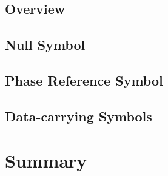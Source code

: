 \documentclass[class=report,11pt,crop=false]{standalone}
\begin{document}
\subsection{Overview}

\subsection{Null Symbol}


\subsection{Phase Reference Symbol}


\subsection{Data-carrying Symbols}



\section{Summary}


\ifstandalone

\printnoidxglossary[type=\acronymtype]
\fi
\end{document}
